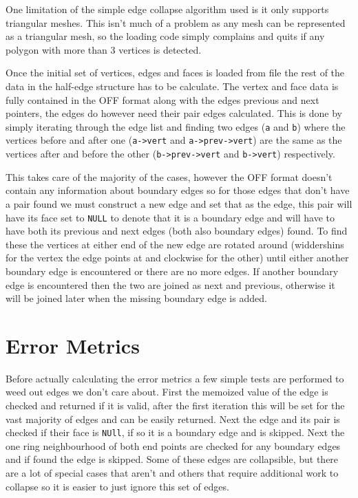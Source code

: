     One limitation of the simple edge collapse algorithm used is it only
    supports triangular meshes.  This isn't much of a problem as any mesh can be
    represented as a triangular mesh, so the loading code simply complains and
    quits if any polygon with more than 3 vertices is detected.

    Once the initial set of vertices, edges and faces is loaded from file the
    rest of the data in the half-edge structure has to be calculate.  The vertex
    and face data is fully contained in the OFF format along with the edges
    previous and next pointers, the edges do however need their pair edges
    calculated.  This is done by simply iterating through the edge list and
    finding two edges (\texttt{a} and \texttt{b}) where the vertices before and
    after one (\texttt{a->vert} and \texttt{a->prev->vert}) are the same as the
    vertices after and before the other (\texttt{b->prev->vert} and
    \texttt{b->vert}) respectively.

    This takes care of the majority of the cases, however the OFF format doesn't
    contain any information about boundary edges so for those edges that don't
    have a pair found we must construct a new edge and set that as the edge,
    this pair will have its face set to \texttt{NULL} to denote that it is a
    boundary edge and will have to have both its previous and next edges (both
    also boundary edges) found.  To find these the vertices at either end of the
    new edge are rotated around (widdershins for the vertex the edge points at
    and clockwise for the other) until either another boundary edge is
    encountered or there are no more edges.  If another boundary edge is
    encountered then the two are joined as next and previous, otherwise it will
    be joined later when the missing boundary edge is added.

  \vspace{-10pt}
  \section{Error Metrics}

    Before actually calculating the error metrics a few simple tests are
    performed to weed out edges we don't care about.  First the memoized value
    of the edge is checked and returned if it is valid, after the first
    iteration this will be set for the vast majority of edges and can be easily
    returned.  Next the edge and its pair is checked if their face is
    \texttt{NUll}, if so it is a boundary edge and is skipped.  Next the one
    ring neighbourhood of both end points are checked for any boundary edges and
    if found the edge is skipped.  Some of these edges are collapsible, but
    there are a lot of special cases that aren't and others that require
    additional work to collapse so it is easier to just ignore this set of
    edges.

